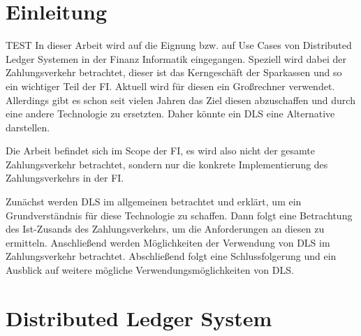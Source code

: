 \documentclass[12pt, a4paper]{article}
\begin{document}
    {
        \setcounter{section}{0}
        \setcounter{page}{1}



    \renewcommand{\figurename}{Abb.}


\noindent %

\section{Einleitung}

TEST
In dieser Arbeit wird auf die Eignung bzw. auf Use Cases von Distributed Ledger Systemen in der Finanz Informatik eingegangen.
Speziell wird dabei der Zahlungsverkehr betrachtet, dieser ist das Kerngeschäft der Sparkassen und so ein wichtiger Teil der FI.
Aktuell wird für diesen ein Großrechner verwendet.
Allerdings gibt es schon seit vielen Jahren das Ziel diesen abzuschaffen und durch eine andere Technologie zu ersetzten.
Daher könnte ein DLS eine Alternative darstellen.

\noindent
Die Arbeit befindet sich im Scope der FI, es wird also nicht der gesamte Zahlungsverkehr betrachtet, sondern nur die konkrete Implementierung des Zahlungsverkehrs in der FI.

\noindent
Zunächst werden DLS im allgemeinen betrachtet und erklärt, um ein Grundverständnis für diese Technologie zu schaffen.
Dann folgt eine Betrachtung des Ist-Zusands des Zahlungsverkehrs, um die Anforderungen an diesen zu ermitteln.
Anschließend werden Möglichkeiten der Verwendung von DLS im Zahlungsverkehr betrachtet.
Abschließend folgt eine Schlussfolgerung und ein Ausblick auf weitere mögliche Verwendungsmöglichkeiten von DLS.    
\noindent

\noindent

\section{Distributed Ledger System}
\label{sec:definition-dls}

}
\end{document}
